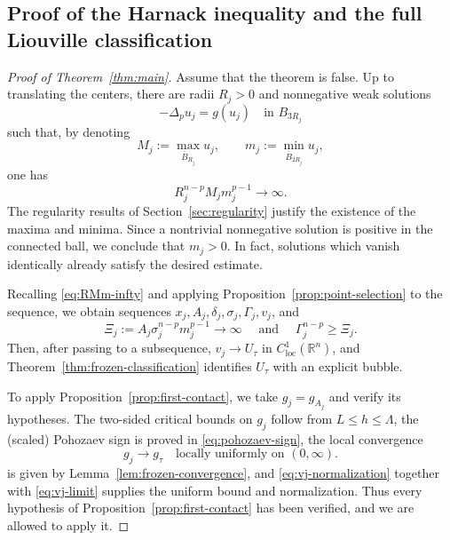 \documentclass[reqno,12pt]{amsart}
\numberwithin{equation}{section}
\theoremstyle{remark}
\newcommand{\R}{\mathbb R}
\newcommand{\loc}{\mathrm{loc}}
\begin{document}
\subsection{Proof of the Harnack inequality and the full Liouville classification}\label{sec:final-proof}
\begin{proof}[Proof of Theorem~\ref{thm:main}]
Assume that the theorem is false.  Up to translating the centers, there are radii $R_j>0$ and nonnegative weak solutions
$$
-\Delta_pu_j=g(u_j) \quad\text{in }B_{3R_j}
$$
such that, by denoting
$$
M_j:=\max_{\overline B_{R_j}}u_j,
\qquad m_j:=\min_{\overline B_{2R_j}}u_j,
$$
one has
\begin{equation}\label{eq:RMm-infty}
R_j^{n-p}M_jm_j^{p-1}\to \infty.
\end{equation}
The regularity results of Section~\ref{sec:regularity} justify the existence of the maxima and minima.  Since a nontrivial nonnegative solution is positive in the connected ball, we conclude that $m_j>0$.  In fact, solutions which vanish identically already satisfy the desired estimate.

Recalling \eqref{eq:RMm-infty} and applying Proposition~\ref{prop:point-selection} to the sequence,  we obtain sequences
$x_j,A_j,\delta_j,\sigma_j,\Gamma_j,v_j$, and
\begin{equation}\label{eq:defn-Xij}
\Xi_j:=A_j\sigma_j^{n-p}m_j^{p-1}\to\infty
\quad \text{ and } \quad \Gamma_j^{n-p}\ge\Xi_j.
\end{equation}
Then, after passing to a subsequence,
$v_j\to U_\tau$ in $C^1_{\loc}(\R^n)$,
and Theorem~\ref{thm:frozen-classification} identifies $U_\tau$ with an explicit bubble.

To apply Proposition~\ref{prop:first-contact}, we take $g_j=g_{A_j}$ and verify its hypotheses.  The two-sided critical  bounds on $g_j$ follow from $L\le h\le\Lambda$, the (scaled) Pohozaev sign is proved in \eqref{eq:pohozaev-sign}, the local convergence 
$$
g_j\to g_\tau
\quad\text{locally uniformly on }(0,\infty).
$$
is given by Lemma~\ref{lem:frozen-convergence}, and \eqref{eq:vj-normalization} together with \eqref{eq:vj-limit} supplies the uniform bound and normalization.  Thus every hypothesis of Proposition~\ref{prop:first-contact} has been verified, and we are allowed to apply it.


\end{proof}
\end{document}
